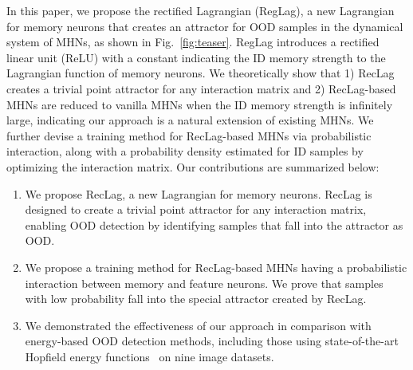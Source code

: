 In this paper, we propose the rectified Lagrangian (RegLag), a new Lagrangian for memory neurons that creates an attractor for OOD samples in the dynamical system of MHNs, as shown in Fig.~\ref{fig:teaser}.
RegLag introduces a rectified linear unit (ReLU) with a constant indicating the ID memory strength to the Lagrangian function of memory neurons.
We theoretically show that 1) RecLag creates a trivial point attractor for any interaction matrix and 2) RecLag-based MHNs are reduced to vanilla MHNs when the ID memory strength is infinitely large, indicating our approach is a natural extension of existing MHNs.
We further devise a training method for RecLag-based MHNs via probabilistic interaction, along with a probability density estimated for ID samples by optimizing the interaction matrix.
Our contributions are summarized below:
\begin{enumerate}
\item We propose RecLag, a new Lagrangian
for memory neurons. RecLag is designed to create a trivial point attractor for any interaction matrix, enabling OOD detection by identifying samples that fall into the attractor as OOD.
\item We propose a training method for RecLag-based MHNs having a probabilistic interaction between memory and feature neurons. We prove that samples with low probability fall into the special attractor created by RecLag.
\item We demonstrated the effectiveness of our approach in comparison with energy-based OOD detection methods, including those using state-of-the-art Hopfield energy functions~\cite{zhang23she} on nine image datasets.
\end{enumerate}

